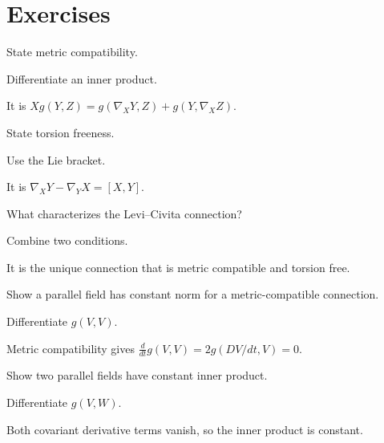 \section{Exercises}

\begin{exercise}\label{exr:vii22-01}
State metric compatibility.
\end{exercise}
\begin{hint}
Differentiate an inner product.
\end{hint}
\begin{solution}
It is \(Xg(Y,Z)=g(\nabla_XY,Z)+g(Y,\nabla_XZ)\).
\end{solution}


\begin{exercise}\label{exr:vii22-02}
State torsion freeness.
\end{exercise}
\begin{hint}
Use the Lie bracket.
\end{hint}
\begin{solution}
It is \(\nabla_XY-\nabla_YX=[X,Y]\).
\end{solution}


\begin{exercise}\label{exr:vii22-03}
What characterizes the Levi--Civita connection?
\end{exercise}
\begin{hint}
Combine two conditions.
\end{hint}
\begin{solution}
It is the unique connection that is metric compatible and torsion free.
\end{solution}


\begin{exercise}\label{exr:vii22-04}
Show a parallel field has constant norm for a metric-compatible connection.
\end{exercise}
\begin{hint}
Differentiate \(g(V,V)\).
\end{hint}
\begin{solution}
Metric compatibility gives \(\frac d{dt}g(V,V)=2g(DV/dt,V)=0\).
\end{solution}


\begin{exercise}\label{exr:vii22-05}
Show two parallel fields have constant inner product.
\end{exercise}
\begin{hint}
Differentiate \(g(V,W)\).
\end{hint}
\begin{solution}
Both covariant derivative terms vanish, so the inner product is constant.
\end{solution}


